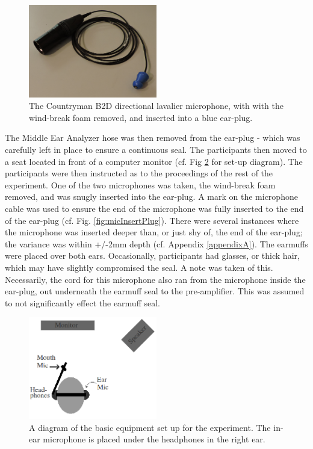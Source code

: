 \begin{figure}
\includegraphics[width=0.5\textwidth]{figure/micInsertPlug.JPG}
\caption{The Countryman B2D directional lavalier microphone, with with the wind-break foam removed, and inserted into a blue ear-plug.}
\label{fig:earmuffSetup}
\end{figure}

The Middle Ear Analyzer hose was then removed from the ear-plug - which was carefully left in place to ensure a continuous seal.  The participants then moved to a seat located in front of a computer monitor (cf. Fig \ref{fig:overallSetUp} for set-up diagram).  The participants were then instructed as to the proceedings of the rest of the experiment. One of the two microphones was taken, the wind-break foam removed, and was snugly inserted into the ear-plug.  A mark on the microphone cable was used to ensure the end of the microphone was fully inserted to the end of the ear-plug (cf. Fig. \ref{fig:micInsertPlug}).  There were several instances where the microphone was inserted deeper than, or just shy of, the end of the ear-plug; the variance was within +/-2mm depth (cf. Appendix \ref{appendixA}).  The earmuffs were placed over both ears.  Occasionally, participants had glasses, or thick hair, which may have slightly compromised the seal.  A note was taken of this. Necessarily, the cord for this microphone also ran from the microphone inside the ear-plug, out underneath the earmuff seal to the pre-amplifier.  This was assumed to not significantly effect the earmuff seal.

\begin{figure}
\includegraphics[width=0.5\textwidth]{figure/overallSetUp.png}
\caption{A diagram of the basic equipment set up for the experiment.  The in-ear microphone is placed under the headphones in the right ear.}
\label{fig:overallSetUp}
\end{figure}

